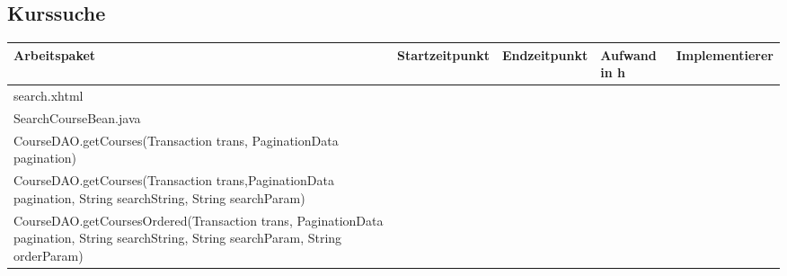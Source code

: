 \begin{landscape}
\subsection{Kurssuche}
\begin{tabular}{|p{10cm}|p{4cm}|p{3cm}|p{3cm}|p{3cm}|}
	\hline  \textbf{Arbeitspaket} & \textbf{Startzeitpunkt} & \textbf{Endzeitpunkt} & \textbf{Aufwand in h} & \textbf{Implementierer} \\ 
	\hline   search.xhtml                                         &                            &                             &                     &\\
	\hline   SearchCourseBean.java                                &                            &                             &                     &\\ 
	\hline   CourseDAO.getCourses(Transaction trans, PaginationData pagination)                                      &                            &                             &                     &\\ 
	\hline  CourseDAO.getCourses(Transaction trans,PaginationData pagination, String searchString, String searchParam)&                            &                             &                     &\\
	\hline  CourseDAO.getCoursesOrdered(Transaction trans, PaginationData pagination, String searchString, String searchParam, String orderParam)&                            &                             &                     &\\ 
	\hline 
\end{tabular} \ \\
\ \\

\end{landscape}



